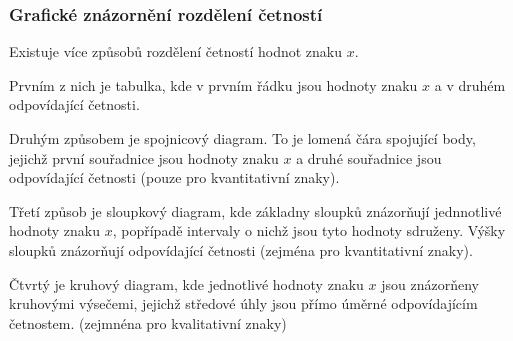 \documentclass[12pt]{article}
\begin{document}
\subsubsection*{Grafické znázornění rozdělení četností}
Existuje více způsobů rozdělení četností hodnot znaku $x$.

Prvním z nich je tabulka, kde v prvním řádku jsou hodnoty znaku $x$ a v druhém odpovídající četnosti.

Druhým způsobem je spojnicový diagram. To je lomená čára spojující body, jejichž první souřadnice jsou hodnoty znaku $x$ a druhé souřadnice jsou odpovídající četnosti (pouze pro kvantitativní znaky).

Třetí způsob je sloupkový diagram, kde základny sloupků znázorňují jednnotlivé hodnoty znaku $x$, popřípadě intervaly o nichž jsou tyto hodnoty sdruženy. Výšky sloupků znázorňují odpovídající četnosti (zejména pro kvantitativní znaky).

Čtvrtý je kruhový diagram, kde jednotlivé hodnoty znaku $x$ jsou znázorňeny kruhovými výsečemi, jejichž středové úhly jsou přímo úměrné odpovídajícím četnostem. (zejmnéna pro kvalitativní znaky)
\end{document}
